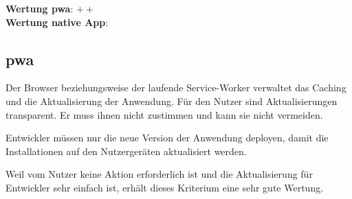 \textbf{Wertung \ac{pwa}}: $++$ \\
\textbf{Wertung native App}:  \\

\subsection{\ac{pwa}}
Der Browser beziehungsweise der laufende Service-Worker verwaltet das Caching und die Aktualisierung der Anwendung. Für den Nutzer sind Aktualisierungen transparent. Er muss ihnen nicht zustimmen und kann sie nicht vermeiden. 

Entwickler müssen nur die neue Version der Anwendung deployen, damit die Installationen auf den Nutzergeräten aktualisiert werden.

Weil vom Nutzer keine Aktion erforderlich ist und die Aktualisierung für Entwickler sehr einfach ist, erhält dieses Kriterium eine sehr gute Wertung.